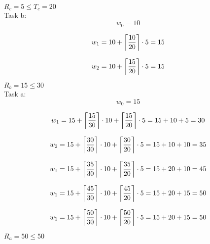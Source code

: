 \documentclass{article}
\DeclarePairedDelimiter{\ceil}{\lceil}{\rceil}
\begin{document}
    $R_c = 5 \leq T_c = 20$ \\
    
    Task b:
    \begin{equation}
        w_0 = 10
    \end{equation}
    
    \begin{equation}
        w_1 = 10 + \ceil*{\frac{10}{20}} \cdot 5 = 15
    \end{equation}

    \begin{equation}
        w_2 = 10 + \ceil*{\frac{15}{20}} \cdot 5 = 15
    \end{equation}
    
    $R_b = 15 \leq 30$\\
    
    Task a:
    \begin{equation}
        w_0 = 15
    \end{equation}
    
    \begin{equation}
        w_1 = 15 + \ceil*{\frac{15}{30}} \cdot 10 + \ceil*{\frac{15}{20}} \cdot 5 = 15 + 10 + 5 = 30
    \end{equation}
    
    \begin{equation}
        w_2 = 15 + \ceil*{\frac{30}{30}} \cdot 10 + \ceil*{\frac{30}{20}} \cdot 5 = 15 + 10 + 10 = 35
    \end{equation}
    
    \begin{equation}
        w_1 = 15 + \ceil*{\frac{35}{30}} \cdot 10 + \ceil*{\frac{35}{20}} \cdot 5 = 15+20+10=45
    \end{equation}
    
    \begin{equation}
        w_1 = 15 + \ceil*{\frac{45}{30}} \cdot 10 + \ceil*{\frac{45}{20}} \cdot 5 = 15 + 20 + 15 = 50
    \end{equation}
    
    \begin{equation}
        w_1 = 15 + \ceil*{\frac{50}{30}} \cdot 10 + \ceil*{\frac{50}{20}} \cdot 5 = 15 + 20 + 15 = 50
    \end{equation}
    
    $R_a = 50 \leq 50$
\end{document}
